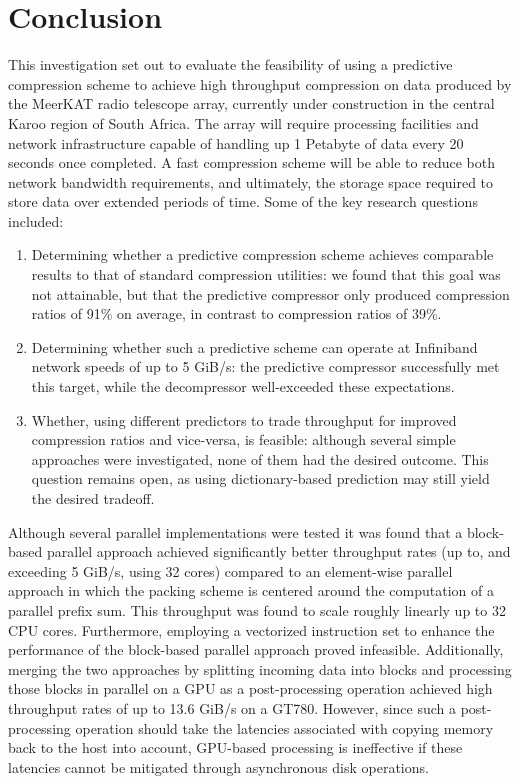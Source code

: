 \section{Conclusion}
This investigation set out to evaluate the feasibility of using a predictive compression scheme to achieve high throughput compression on data produced by the MeerKAT radio telescope array, currently under construction
in the central Karoo region of South Africa. The array will require processing facilities and network infrastructure capable of handling up 1 Petabyte of data every 20 seconds once completed. A fast compression scheme will be able
to reduce both network bandwidth requirements, and ultimately, the storage space required to store data over extended periods of time. Some of the key research questions included:
\begin{enumerate}
 \item Determining whether a predictive compression scheme achieves comparable results to that of standard compression utilities: we found that
 this goal was not attainable, but that the predictive compressor only produced compression ratios of 91\% on average, in contrast to compression ratios of 39\%.
 \item Determining whether such a predictive scheme can operate at Infiniband network speeds of up to 5 GiB/s: the predictive compressor successfully met this target,
 while the decompressor well-exceeded these expectations.
 \item Whether, using different predictors to trade throughput for improved compression ratios and vice-versa, is feasible: although several simple approaches
 were investigated, none of them had the desired outcome. This question remains open, as using dictionary-based prediction may still yield the desired tradeoff. 
\end{enumerate}
Although several parallel implementations were tested it was found that a block-based parallel approach achieved significantly better throughput rates (up to, and exceeding 5 GiB/s, using 32 cores) compared to an 
element-wise parallel approach in which the packing scheme is centered around the computation of a parallel prefix sum. This throughput was found to scale roughly linearly up to 32 CPU cores. Furthermore, employing 
a vectorized instruction set to enhance the performance of the block-based parallel approach proved infeasible. Additionally, merging the two approaches by splitting incoming data into blocks 
and processing those blocks in parallel on a GPU as a post-processing operation achieved high throughput rates of up to 13.6 GiB/s on a GT780. However, since such a post-processing operation should take the 
latencies associated with copying memory back to the host into account, GPU-based processing is ineffective if these latencies cannot be mitigated through asynchronous disk operations.

